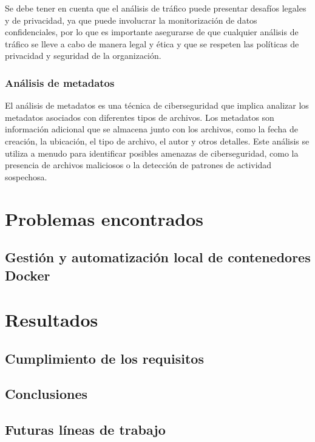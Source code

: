            Se debe tener en cuenta que el análisis de tráfico puede presentar desafíos legales y de privacidad, ya que puede involucrar la monitorización de datos confidenciales, por lo que es importante asegurarse de que cualquier análisis de tráfico se lleve a cabo de manera legal y ética y que se respeten las políticas de privacidad y seguridad de la organización.
        
        \subsection{Análisis de metadatos}
            
            El análisis de metadatos es una técnica de ciberseguridad que implica analizar los metadatos asociados con diferentes tipos de archivos. Los metadatos son información adicional que se almacena junto con los archivos, como la fecha de creación, la ubicación, el tipo de archivo, el autor y otros detalles. Este análisis se utiliza a menudo para identificar posibles amenazas de ciberseguridad, como la presencia de archivos maliciosos o la detección de patrones de actividad sospechosa.
            
            \cleardoublepage


\chapter{Problemas encontrados}

    \section{Gestión y automatización local de contenedores Docker}

    
    
\chapter{Resultados}

    \section{Cumplimiento de los requisitos}
    
    \section{Conclusiones}
    
    \section{Futuras líneas de trabajo}
        \label{sec:futuras-lineas-trabajo}
        

